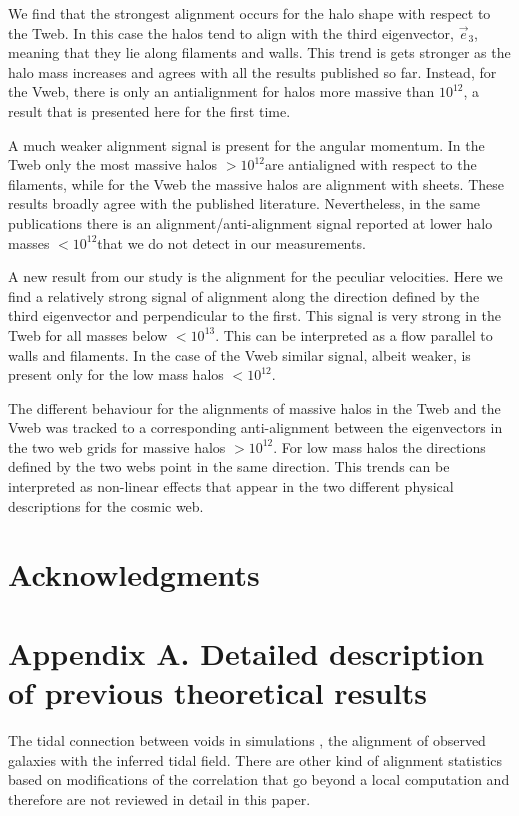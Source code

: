 \documentclass[useAMS,usenatbib]{mn2e}
\newcommand{\hMsun}{{\ifmmode{h^{-1}{\rm
        {M_{\odot}}}}\else{$h^{-1}{\rm{M_{\odot}}}$~}\fi}}
\begin{document}
We find that the strongest alignment occurs for the halo shape with
respect to the Tweb. In this case the halos tend to align with the
third eigenvector, $\vec{e}_3$, meaning that they lie along filaments
and walls. This trend is gets stronger as the halo mass
increases and agrees with all the results published so far. Instead,
for the Vweb, there is only an antialignment for halos more massive
than $10^{12}$\hMsun, a result that is presented here for the first
time.  

A much weaker alignment signal is present for the angular momentum. In
the Tweb only the most massive halos $>10^{12}$\hMsun are antialigned
with respect to the filaments, while for the Vweb the massive halos
are alignment with sheets. These results broadly agree with the
published literature. Nevertheless, in the same publications there is an
alignment/anti-alignment signal reported at lower halo masses
$<10^{12}$\hMsun that we do not detect in our measurements. 

A new result from our study is the alignment for the peculiar
velocities. Here we find a relatively strong signal of alignment along
the direction defined by the third eigenvector and perpendicular to
the first. This signal is very strong in the Tweb for all masses below
$<10^{13}$\hMsun. This can be interpreted as a flow parallel to walls
and filaments. In the case of the Vweb similar signal, albeit weaker,
is present only for the low mass halos $<10^{12}$\hMsun.

The different behaviour for the alignments of massive halos in the
Tweb and the Vweb was tracked to a corresponding anti-alignment
between the eigenvectors in the two web grids for massive halos
$>10^{12}$\hMsun. For low mass halos the directions defined by the two
webs point in the same direction. This trends can be interpreted as
non-linear effects that appear in the two different physical
descriptions for the cosmic web. 

\section*{Acknowledgments} 

\section*{Appendix A. Detailed description of previous theoretical results}


The tidal connection between voids in simulations \citep{Platen2008},
the alignment of observed galaxies with the inferred tidal
field\citep{Lee2007,Jones2010}. There are other kind of alignment
statistics based on modifications of the correlation
\citep{Paz2008,Faltenbacher2009} that go beyond a local computation
and therefore are not reviewed in detail in this paper.
\end{document}
